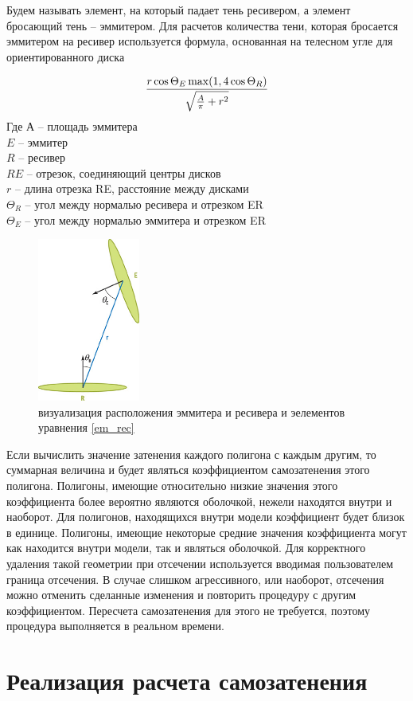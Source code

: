 Будем называть элемент, на который падает тень ресивером, а элемент бросающий тень  -- эммитером. Для расчетов количества тени, которая бросается эммитером на ресивер используется формула, основанная на телесном угле для ориентированного диска 


\begin{equation}
	{{r\cos{\Theta_E \max(1, 4\cos{\Theta_R})}}\over{\sqrt{{A\over\pi} + r^2}}}
	\label{em_rec}
\end{equation}
Где $А$ -- площадь эммитера\\
$E$ -- эммитер\\
$R$ -- ресивер\\
$RE$ -- отрезок, соединяющий центры дисков\\
$r$ -- длина отрезка RE, расстояние между дисками\\
$\Theta_R$ -- угол между нормалью ресивера и отрезком ER\\
$\Theta_E$ -- угол между нормалью эммитера и отрезком ER\\

\begin{figure}[h]
	\center
	\includegraphics[width=0.3\textwidth]{14_ambient_occlusion_03}
	\caption{визуализация расположения эммитера и ресивера и эелементов уравнения \ref{em_rec}}\label{fig:ao03}
\end{figure}

Если вычислить значение затенения каждого полигона с каждым другим, то суммарная величина и будет являться коэффициентом самозатенения этого полигона. Полигоны, имеющие относительно низкие значения этого коэффициента более вероятно являются оболочкой, нежели находятся внутри и наоборот. Для полигонов, находящихся внутри модели коэффициент будет близок в единице. Полигоны, имеющие некоторые средние значения коэффициента могут как находится внутри модели, так и являться оболочкой. Для корректного удаления такой геометрии при отсечении используется вводимая пользователем граница отсечения. В случае слишком агрессивного, или наоборот, отсечения можно отменить сделанные изменения и повторить процедуру с другим коэффициентом. Пересчета самозатенения для этого не требуется, поэтому процедура выполняется в реальном времени.

\clearpage
\section{Реализация расчета самозатенения}\label{main_part}

